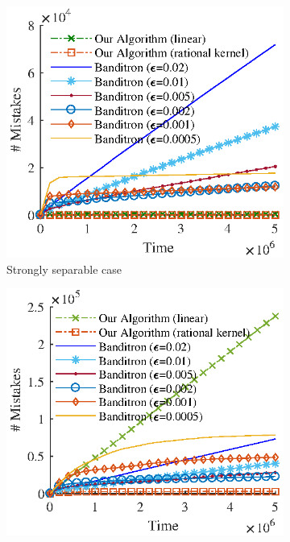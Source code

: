 \begin{figure}
    \centering
    \begin{subfigure}[b]{0.23\textwidth}
        \captionsetup{justification=centering}
        \begin{center}
        \hspace*{-0.3cm} \includegraphics[width=1.15\textwidth, trim={0, 0.1cm, 0, 0}, clip]{figures/strong3}
        \caption{Strongly separable case}
        \end{center}
    \end{subfigure}
    \hfill
    \begin{subfigure}[b]{0.23\textwidth}
        \captionsetup{justification=centering}
        \centering
        \hspace*{-0.3cm}  \includegraphics[width=1.15\textwidth, trim={0, 0.1cm, 0, 0}, clip]{figures/weak3}

\end{subfigure}
\end{figure}
